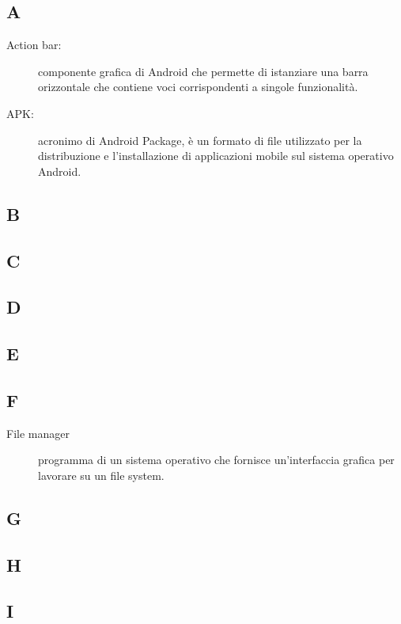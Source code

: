 \documentclass[../manuale-utente.tex]{subfiles}
\begin{document}
\subsection{A}
\begin{description}
    \item[Action bar:] componente grafica di Android che permette di istanziare una barra orizzontale che contiene voci corrispondenti a singole funzionalità.
    \item[APK:] acronimo di Android Package, è un formato di file utilizzato per la distribuzione e l'installazione di applicazioni mobile sul sistema operativo Android.
\end{description}

\subsection{B}

\subsection{C}

\subsection{D}

\subsection{E}

\subsection{F}
\begin{description}
    \item[File manager] programma di un sistema operativo che fornisce un'interfaccia grafica per lavorare su un file system.
\end{description}

\subsection{G}

\subsection{H}

\subsection{I}
\end{document}
